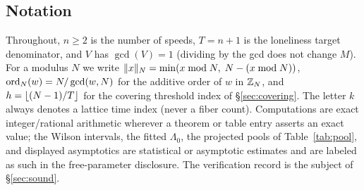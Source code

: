 \subsection{Notation}

Throughout, $n\ge 2$ is the number of speeds, $T=n+1$ is the loneliness
target denominator, and $V$ has $\gcd(V)=1$ (dividing by the gcd does
not change $M$). For a modulus $N$ we write $\lVert x \rVert_{N}=\min(x\bmod N,\;
N-(x\bmod N))$, $\operatorname{ord}_N(w)=N/\gcd(w,N)$ for the additive order of $w$
in $\mathbb{Z}_N$, and $h=\left\lfloor (N-1)/T \right\rfloor$ for the covering threshold index
of \S\ref{sec:covering}. The letter $k$ always denotes a lattice time
index (never a fiber count). Computations are exact integer/rational
arithmetic wherever a theorem or table entry asserts an exact value; the
Wilson intervals, the fitted $\Lambda_0$, the projected pools of
Table~\ref{tab:pool}, and displayed asymptotics are statistical or
asymptotic estimates and are labeled as such in the free-parameter
disclosure. The verification record is the subject of
\S\ref{sec:sound}.

